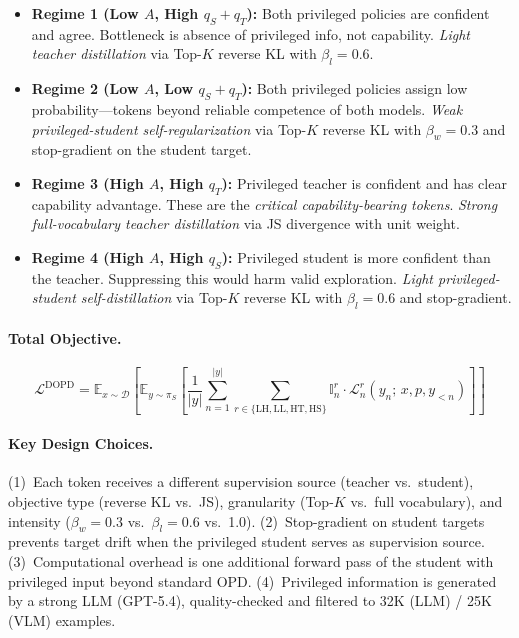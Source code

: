 \documentclass[11pt,a4paper]{article}
\begin{document}
\begin{itemize}
\item \textbf{Regime 1 (Low $A$, High $q_S + q_T$):} Both privileged policies are confident and agree. Bottleneck is absence of privileged info, not capability. \emph{Light teacher distillation} via Top-$K$ reverse KL with $\beta_l = 0.6$.

\item \textbf{Regime 2 (Low $A$, Low $q_S + q_T$):} Both privileged policies assign low probability---tokens beyond reliable competence of both models. \emph{Weak privileged-student self-regularization} via Top-$K$ reverse KL with $\beta_w = 0.3$ and stop-gradient on the student target.

\item \textbf{Regime 3 (High $A$, High $q_T$):} Privileged teacher is confident and has clear capability advantage. These are the \emph{critical capability-bearing tokens}. \emph{Strong full-vocabulary teacher distillation} via JS divergence with unit weight.

\item \textbf{Regime 4 (High $A$, High $q_S$):} Privileged student is more confident than the teacher. Suppressing this would harm valid exploration. \emph{Light privileged-student self-distillation} via Top-$K$ reverse KL with $\beta_l = 0.6$ and stop-gradient.
\end{itemize}

\paragraph{Total Objective.}
\begin{equation}
\mathcal{L}^{\mathrm{DOPD}} = \mathbb{E}_{x \sim \mathcal{D}}\!\left[\mathbb{E}_{y \sim \pi_S}\!\left[\frac{1}{|y|}\sum_{n=1}^{|y|} \sum_{r \in \{\mathrm{LH,LL,HT,HS}\}} \mathbb{I}^r_n \cdot \mathcal{L}^r_n(y_n;\, x, p, y_{<n})\right]\right]
\end{equation}

\paragraph{Key Design Choices.} (1)~Each token receives a different supervision source (teacher vs.\ student), objective type (reverse KL vs.\ JS), granularity (Top-$K$ vs.\ full vocabulary), and intensity ($\beta_w = 0.3$ vs.\ $\beta_l = 0.6$ vs.\ 1.0). (2)~Stop-gradient on student targets prevents target drift when the privileged student serves as supervision source. (3)~Computational overhead is one additional forward pass of the student with privileged input beyond standard OPD. (4)~Privileged information is generated by a strong LLM (GPT-5.4), quality-checked and filtered to 32K (LLM) / 25K (VLM) examples.
\end{document}
